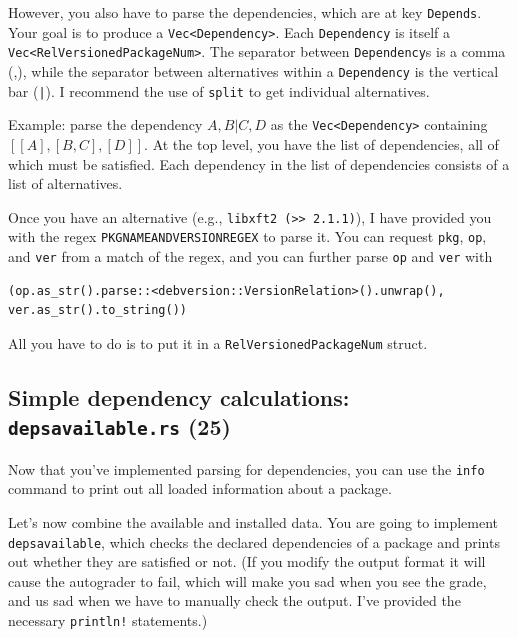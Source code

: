 \documentclass[12pt]{article}
\renewcommand{\_}{\kern-1.5pt\textunderscore\kern-1.5pt}
\begin{document}
\vspace{1em}
However, you also have to parse the dependencies, which are at key \texttt{Depends}. Your goal is to produce a \verb+Vec<Dependency>+.
Each \texttt{Dependency} is itself a \verb+Vec<RelVersionedPackageNum>+. The separator between
\texttt{Dependency}s is a comma (,), while the separator between alternatives within a \texttt{Dependency} is
the vertical bar (\texttt{|}). I recommend the use of \texttt{split} to get individual alternatives.\par

\vspace{1em}
Example: parse the dependency $A, B | C, D$ as the \verb+Vec<Dependency>+ containing $[[A], [B, C], [D]]$. At the top level, you have the list of dependencies, all of which must be satisfied. Each dependency in the list of dependencies consists of a list of alternatives.

\vspace{1em}
Once you have an alternative (e.g., \texttt{libxft2 (>> 2.1.1)}), I have provided you with the regex \texttt{PKGNAME\_AND\_VERSION\_REGEX} 
to parse it.
You can request \texttt{pkg}, \texttt{op}, and \texttt{ver} from a match of the regex, and you can further parse \texttt{op}
and \texttt{ver} with
{\small
\begin{verbatim}
(op.as_str().parse::<debversion::VersionRelation>().unwrap(), ver.as_str().to_string())
\end{verbatim}
}
All you have to do is to put it in a \texttt{RelVersionedPackageNum} struct.

\subsection*{Simple dependency calculations: \texttt{deps\_available.rs} (25)}
Now that you've implemented parsing for dependencies, you can use the \texttt{info} command to print out all loaded
information about a package.\par

\vspace{1em}
Let's now combine the available and installed data. You are going to implement \texttt{deps\_available},
which checks the declared dependencies of a package and prints out whether they are satisfied or not.
(If you modify the output format it will cause the autograder to fail, which will make you sad when you see the grade, and us sad when we have to manually check the output.
I've provided the necessary \texttt{println!} statements.)
\end{document}
